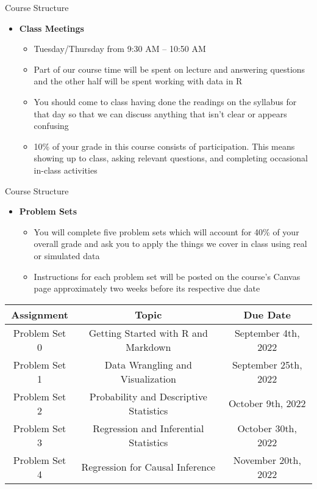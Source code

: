 \documentclass[12pt,ignorenonframetext,aspectratio=169]{beamer}
\begin{document}
\begin{frame}{Course Structure}
\begin{itemize}[<+->]
\item
  \textbf{Class Meetings}

  \begin{itemize}[<+->]
  \item
    Tuesday/Thursday from 9:30 AM -- 10:50 AM
  \item
    Part of our course time will be spent on lecture and answering
    questions and the other half will be spent working with data in R
  \item
    You should come to class having done the readings on the syllabus
    for that day so that we can discuss anything that isn't clear or
    appears confusing
  \item
    10\% of your grade in this course consists of participation. This
    means showing up to class, asking relevant questions, and completing
    occasional in-class activities
  \end{itemize}
\end{itemize}
\end{frame}

\begin{frame}{Course Structure}
\protect\hypertarget{course-structure-1}{}
\begin{itemize}[<+->]
\item
  \textbf{Problem Sets}

  \begin{itemize}[<+->]
  \item
    You will complete five problem sets which will account for 40\% of
    your overall grade and ask you to apply the things we cover in class
    using real or simulated data
  \item
    Instructions for each problem set will be posted on the course's
    Canvas page approximately two weeks before its respective due date
  \end{itemize}
\end{itemize}

\footnotesize
\begin{tabular}[t]{ccc}
\toprule
Assignment & Topic & Due Date\\
\midrule
Problem Set 0 & Getting Started with R and Markdown & September 4th, 2022\\
Problem Set 1 & Data Wrangling and Visualization & September 25th, 2022\\
Problem Set 2 & Probability and Descriptive Statistics & October 9th, 2022\\
Problem Set 3 & Regression and Inferential Statistics & October 30th, 2022\\
Problem Set 4 & Regression for Causal Inference & November 20th, 2022\\
\bottomrule
\end{tabular}
\end{frame}
\end{document}
